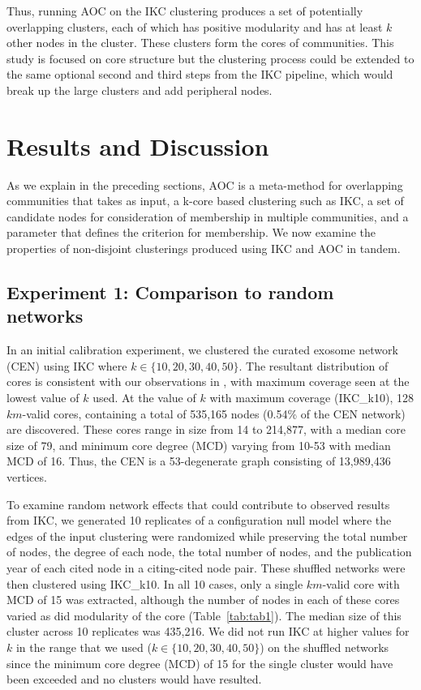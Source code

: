 \documentclass[12pt, oneside]{article}   	%
\begin{document}
Thus, running   AOC on the IKC clustering produces a set of potentially overlapping clusters, each of which has positive modularity and has at least $k$ other nodes in the cluster. These clusters form the cores of communities.  This study is focused on core structure but the clustering process could be extended to the same optional second and third steps from the IKC pipeline, which would break up the large clusters and add peripheral nodes. 

\section{Results and Discussion}

As we explain in the preceding sections, AOC is a meta-method for overlapping communities that takes as input, a k-core based clustering such as IKC, a set of candidate nodes for consideration of membership in multiple communities, and a parameter that defines the criterion for membership. We now examine the properties of non-disjoint clusterings produced using IKC and AOC in tandem. 

\subsection{Experiment 1: Comparison to random networks} In an initial calibration experiment, we clustered the curated exosome network (CEN) using IKC where $k \in {\{10,20,30,40, 50\}}$. The resultant distribution of cores is consistent with our observations in \cite[Figure~3]{Wedell2022}, with maximum coverage seen at the lowest value of $k$ used. At the value of $k$ with maximum coverage (IKC\_k10), 128 $km$-valid cores, containing a total of 535,165 nodes (0.54\% of the CEN network) are discovered. These cores range in size from 14 to 214,877, with a median core size of 79, and minimum core degree (MCD) varying from 10-53 with median MCD of 16. Thus, the CEN is a 53-degenerate graph consisting of 13,989,436 vertices.

To examine random network effects that could contribute to observed results from IKC, we generated 10 replicates of a configuration null model where the edges of the input clustering were randomized while preserving the total number of nodes, the degree of each node, the total number of nodes, and the publication year of each cited node in a citing-cited node pair. These shuffled networks were then clustered using IKC\_k10. In all 10 cases, only a single $km$-valid core with MCD of 15 was extracted, although the number of nodes in each of these cores varied as did modularity of the core (Table~\ref{tab:tab1}). The median size of this cluster across 10 replicates was 435,216. We did not run IKC at higher values for $k$ in the range that we used ($k \in {\{10,20,30,40, 50\}}$) on the shuffled networks since  the minimum core degree (MCD) of 15 for the single cluster would have been exceeded and no clusters would have resulted. 
\end{document}
